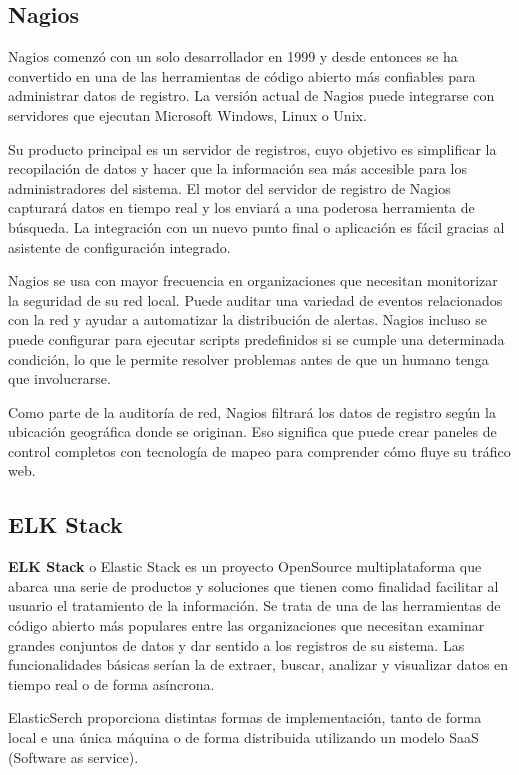 \subsection{Nagios}

Nagios comenzó con un solo desarrollador en 1999 y desde entonces se ha convertido en una de las herramientas de código abierto más confiables para administrar datos de registro. La versión actual de Nagios puede integrarse con servidores que ejecutan Microsoft Windows, Linux o Unix.

Su producto principal es un servidor de registros, cuyo objetivo es simplificar la recopilación de datos y hacer que la información sea más accesible para los administradores del sistema. El motor del servidor de registro de Nagios capturará datos en tiempo real y los enviará a una poderosa herramienta de búsqueda. La integración con un nuevo punto final o aplicación es fácil gracias al asistente de configuración integrado.

Nagios se usa con mayor frecuencia en organizaciones que necesitan monitorizar la seguridad de su red local. Puede auditar una variedad de eventos relacionados con la red y ayudar a automatizar la distribución de alertas. Nagios incluso se puede configurar para ejecutar scripts predefinidos si se cumple una determinada condición, lo que le permite resolver problemas antes de que un humano tenga que involucrarse.

Como parte de la auditoría de red, Nagios filtrará los datos de registro según la ubicación geográfica donde se originan. Eso significa que puede crear paneles de control completos con tecnología de mapeo para comprender cómo fluye su tráfico web.

\subsection{ELK Stack}

\textbf{ELK Stack} o Elastic Stack es un proyecto OpenSource multiplataforma que abarca una serie de productos y soluciones que tienen como finalidad facilitar al usuario el tratamiento de la información. Se trata de una de las herramientas de código abierto más populares entre las organizaciones que necesitan examinar grandes conjuntos de datos y dar sentido a los registros de su sistema. Las funcionalidades básicas serían la de extraer, buscar, analizar y visualizar datos en tiempo real o de forma asíncrona.

ElasticSerch proporciona distintas formas de implementación, tanto de forma local e una única máquina o de forma distribuida utilizando un modelo SaaS (Software as service).

